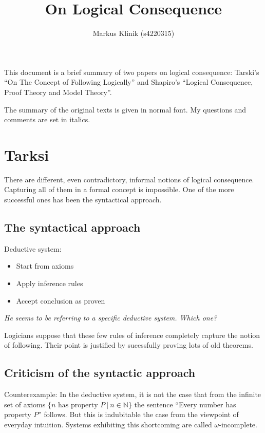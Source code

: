 \documentclass[a4paper]{article}
\begin{document}
\title{On Logical Consequence}
\author{Markus Klinik (s4220315)}
\maketitle

This document is a brief summary of two papers on logical consequence: Tarski's
``On The Concept of Following Logically'' and Shapiro's ``Logical Consequence,
Proof Theory and Model Theory''.

The summary of the original texts is given in normal font.  My questions and
comments are set in italics.

\section{Tarksi}

There are different, even contradictory, informal notions of logical
consequence.  Capturing all of them in a formal concept is impossible.  One of
the more successful ones has been the syntactical approach.

\subsection{The syntactical approach}

Deductive system:

\begin{itemize}
    \item Start from axioms
    \item Apply inference rules
    \item Accept conclusion as proven
\end{itemize}

\emph{He seems to be referring to a specific deductive system. Which one?}

Logicians suppose that these few rules of inference completely capture the
notion of following.  Their point is justified by sucessfully proving lots of
old theorems.

\subsection{Criticism of the syntactic approach}

Counterexample: In the deductive system, it is not the
case that from the infinite set of axioms $\{ n\text{ has property }P\ |\ n \in
\mathbb{N} \}$ the sentence ``Every number has property $P$'' follows.  But this
is indubitable the case from the viewpoint of everyday intuition.  Systems
exhibiting this shortcoming are called $\omega$-incomplete.
\end{document}
